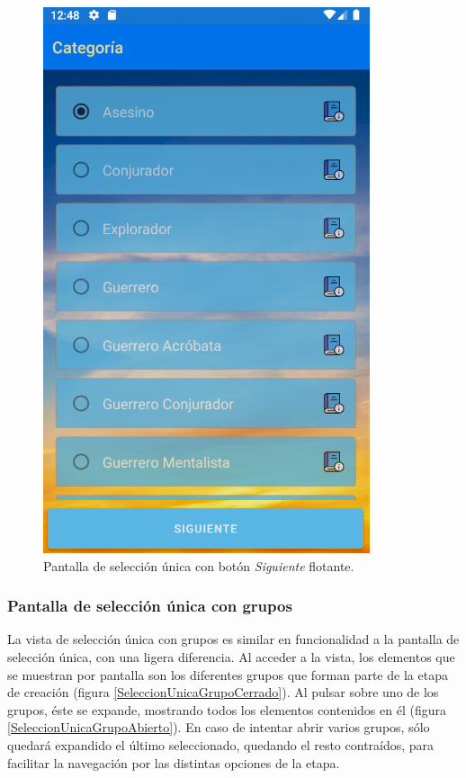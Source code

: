\begin{figure}[H]
    \centering
    \includegraphics[scale=0.7]{Figures/Capturas/SeleccionUnicaFlotante.png}
    \caption{Pantalla de selección única con botón \textit{Siguiente} flotante.}
    \label{Siguiente}    
\end{figure}

\subsubsection{Pantalla de selección única con grupos}
La vista de selección única con grupos es similar en funcionalidad a la pantalla de selección única, con una ligera diferencia.
Al acceder a la vista, los elementos que se muestran por pantalla son los diferentes grupos que forman parte de la etapa de creación
(figura \ref*{SeleccionUnicaGrupoCerrado}). Al pulsar sobre uno de los grupos, éste se expande, mostrando todos los elementos 
contenidos en él (figura \ref*{SeleccionUnicaGrupoAbierto}). En caso de intentar abrir varios grupos, sólo quedará expandido 
el último seleccionado, quedando el resto contraídos, para facilitar la navegación por las distintas opciones de la etapa.

